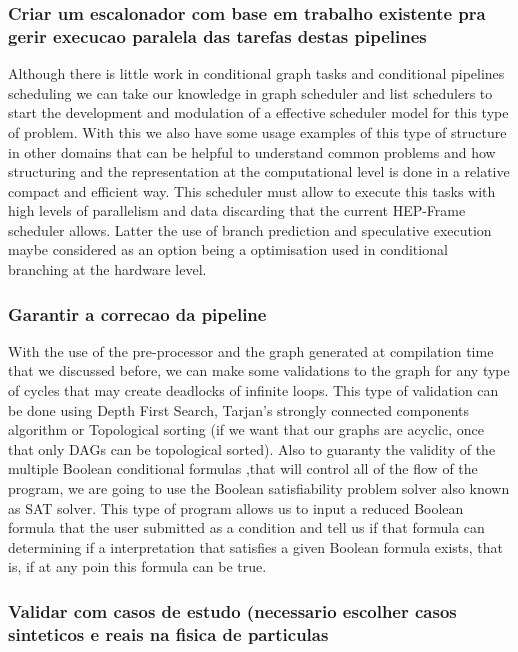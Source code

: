 \subsubsection{Criar um escalonador com base em trabalho existente pra gerir execucao paralela das tarefas destas pipelines}
Although there is little work in conditional graph tasks and conditional pipelines scheduling we can take our knowledge in graph scheduler and list schedulers to start the development and modulation of a effective scheduler model for this type of problem. With this we also have some usage examples of this type of structure in other domains that can be helpful to understand common problems and how structuring and the representation at the computational level is done in a relative compact and efficient way.
This scheduler must allow to execute this tasks with high levels of parallelism and data discarding that the current HEP-Frame scheduler allows.
Latter the use of branch prediction and speculative execution maybe considered as an option being a optimisation used in conditional branching at the hardware level.

\subsubsection{Garantir a correcao da pipeline}
With the use of the pre-processor and the graph generated at compilation time that we discussed before, we can make some validations to the graph for any type of cycles that may create deadlocks of infinite loops. This type of validation can be done using Depth First Search, Tarjan's strongly connected components algorithm or Topological sorting (if we want that our graphs are acyclic, once that only DAGs can be topological sorted).
Also to guaranty the validity of the multiple Boolean conditional formulas ,that will control all of the flow of the program, we are going to use the Boolean satisfiability problem solver also known as SAT solver. This type of program allows us to input a reduced Boolean formula that the user submitted as a condition and tell us if that formula can determining if a interpretation that satisfies a given Boolean formula exists, that is, if at any poin this formula can be true.

\subsubsection{Validar com casos de estudo (necessario escolher casos sinteticos e reais na fisica de particulas}

